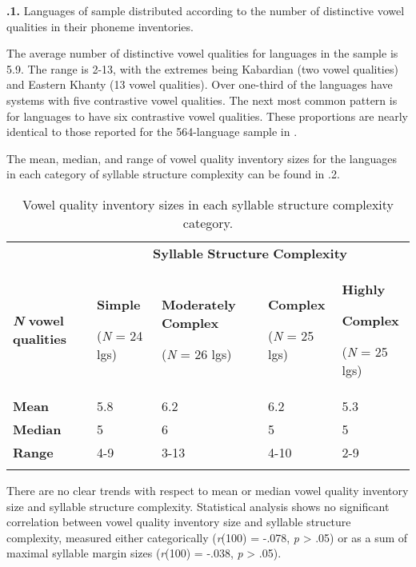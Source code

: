 \textbf{.1.} Languages of sample distributed according to the number of distinctive vowel qualities in their phoneme inventories.



  The average number of distinctive vowel qualities for languages in the sample is 5.9. The range is 2-13, with the extremes being Kabardian (two vowel qualities) and Eastern Khanty (13 vowel qualities). Over one-third  of the languages have systems with five contrastive vowel qualities. The next most common pattern is for languages to have six contrastive vowel qualities. These proportions are nearly identical to those reported for the 564-language sample in \citet{Maddieson2013c}.



  The mean, median, and range of vowel quality inventory sizes for the languages in each category of syllable structure complexity can be found in .2.






\begin{table}
\begin{tabularx}{\textwidth}{XXXXX}
 & \multicolumn{4}{c}{ \textbf{Syllable} \textbf{Structure} \textbf{Complexity}}\\
\lsptoprule
\textbf{\textit{N}} \textbf{vowel} \textbf{qualities} & { \textbf{Simple}}

 (\textit{N} = 24 lgs) & { \textbf{Moderately} \textbf{Complex}}

 (\textit{N} = 26 lgs) & { \textbf{Complex}}

 (\textit{N} = 25 lgs) & { \textbf{Highly} }

{ \textbf{Complex}}

 (\textit{N} = 25 lgs)\\
\textbf{Mean} & 5.8 & 6.2 & 6.2 & 5.3\\
\textbf{Median} & 5 & 6 & 5 & 5\\
\textbf{Range} & 4-9 & 3-13 & 4-10 & 2-9\\
\lspbottomrule
\end{tabularx}
\caption{\label{4.2}Vowel quality inventory sizes in each syllable structure complexity category.}
\end{table}




  There are no clear trends with respect to mean or median vowel quality inventory size and syllable structure complexity. Statistical analysis shows no significant correlation between vowel quality inventory size and syllable structure complexity, measured either categorically (\textit{r}(100) = -.078, \textit{p} > .05) or as a sum of maximal syllable margin sizes (\textit{r}(100) = -.038, \textit{p} > .05).


